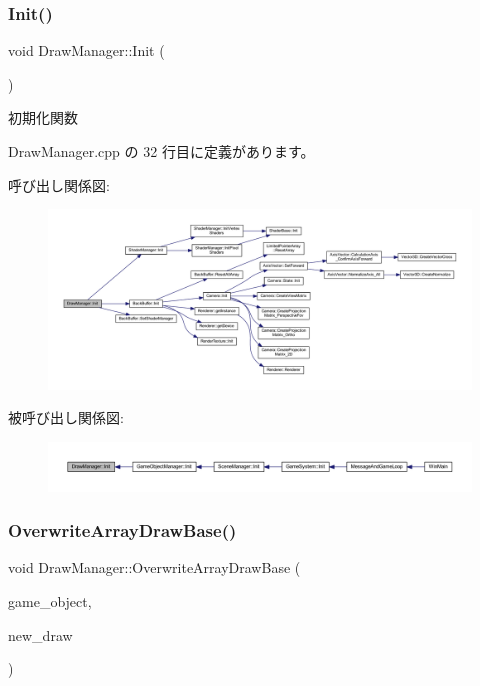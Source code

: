 \subsubsection{\texorpdfstring{Init()}{Init()}}
{\footnotesize\ttfamily void Draw\+Manager\+::\+Init (\begin{DoxyParamCaption}{ }\end{DoxyParamCaption})}



初期化関数 



 Draw\+Manager.\+cpp の 32 行目に定義があります。

呼び出し関係図\+:
\nopagebreak
\begin{figure}[H]
\begin{center}
\leavevmode
\includegraphics[width=350pt]{class_draw_manager_a3cb9319d492285bd9dfc983d27e5d04f_cgraph}
\end{center}
\end{figure}
被呼び出し関係図\+:
\nopagebreak
\begin{figure}[H]
\begin{center}
\leavevmode
\includegraphics[width=350pt]{class_draw_manager_a3cb9319d492285bd9dfc983d27e5d04f_icgraph}
\end{center}
\end{figure}
\mbox{\label{class_draw_manager_a94ef5a241c8d78187a2a6c0ed3c9efec}} 
\subsubsection{\texorpdfstring{Overwrite\+Array\+Draw\+Base()}{OverwriteArrayDrawBase()}}
{\footnotesize\ttfamily void Draw\+Manager\+::\+Overwrite\+Array\+Draw\+Base (\begin{DoxyParamCaption}\item[{\mbox{\hyperlink{class_game_object_base}{Game\+Object\+Base}} $\ast$}]{game\+\_\+object,  }\item[{\mbox{\hyperlink{class_draw_base}{Draw\+Base}} $\ast$}]{new\+\_\+draw }\end{DoxyParamCaption})}



